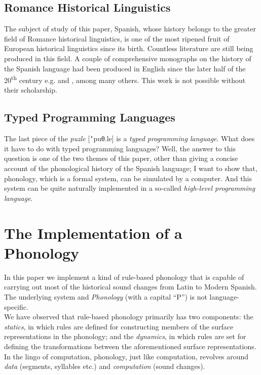 \documentclass{report}[12pt]
\begin{document}
\subsection*{Romance Historical Linguistics}

The subject of study of this paper, Spanish, whose history belongs to the greater field of Romance historical linguistics, is one of the most ripened fruit of European historical linguistics since its birth. Countless literature are still being produced in this field. A couple of comprehensive monographs on the history of the Spanish language had been produced in English since the later half of the 20\textsuperscript{th} century e.g. \cite{penny_spanish} and \cite{lloyd_spanish}, among many others. This work is not possible without their scholarship.

\subsection*{Typed Programming Languages}

The last piece of the \emph{puzle} [\texttt{'}puθ.le] is a \emph{typed programming language}. What does it have to do with typed programming languages? Well, the answer to this question is one of the two themes of this paper, other than giving a concise account of the phonological history of the Spanish language; I want to show that, phonology, which is a formal system, can be simulated by a computer. And this system can be quite naturally implemented in a so-called \emph{high-level programming language}.

\section*{The Implementation of a Phonology}

In this paper we implement a kind of rule-based phonology that is capable of carrying out most of the historical sound changes from Latin to Modern Spanish. The underlying system and \emph{Phonology} (with a capital ``P'') is not language-specific. \\
We have observed that rule-based phonology primarily has two components: the \emph{statics}, in which rules are defined for constructing members of the surface representations in the phonology; and the \emph{dynamics}, in which rules are set for defining the transformations between the aforementioned surface representations. In the lingo of computation, phonology, just like computation, revolves around \emph{data} (segments, syllables etc.) and \emph{computation} (sound changes).
\end{document}
